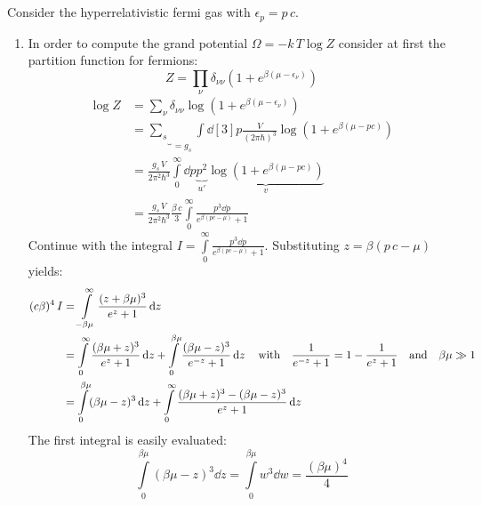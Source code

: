 \documentclass[11pt,a4paper]{scrartcl}
\newcommand{\gs}{g_{s}}
\begin{document}
\section{}

Consider the hyperrelativistic fermi gas with $\epsilon_{p}=p\,c$.

\begin{enumerate}[label=\textbf{\large(\alph*)}, itemsep=2\baselineskip]

\item
    In order to compute the grand potential $\Omega=-k\,T\log{Z}$ consider at
    first the partition function for fermions:
    \begin{equation*}
        Z=\prod_{\nu}\delta_{\nu\nu}\left(1+e^{\beta(\mu-\epsilon_{\nu})}\right)
    \end{equation*}
    \begin{align*}
        \log{Z}&=\sum_{\nu}\delta_{\nu\nu}\log(1+e^{\beta(\mu-\epsilon_{\nu})})
        \\
        &=\underbrace{\sum_{s}}_{=\gs}\int\dd[3]{p}\frac{V}{(2\pi\hbar)^3}
        \log(1+e^{\beta(\mu-pc)}) \\
        &=\frac{\gs\,V}{2\pi^2\hbar^3}\int\limits_{0}^{\infty}\dd{p}
        \underbrace{p^2}_{u'}
        \underbrace{\log(1+e^{\beta(\mu-pc)})}_{v} \\
        &=\frac{\gs\,V}{2\pi^2\hbar^3}\frac{\beta\,c}{3}\int\limits_{0}^{\infty}\frac{p^3\dd{p}}{e^{\beta(pc-\mu)}+1}
    \end{align*}
    Continue with the integral
    $\displaystyle
        I=\int\limits_{0}^{\infty}\frac{p^3\dd{p}}{e^{\beta(pc-\mu)}+1}
    $.
    Substituting $z=\beta(p\,c-\mu)$ yields:
    \begin{align*}
        (c\beta)^4\,I&=\int\limits_{-\beta\mu}^{\infty}\frac{(z+\beta\mu)^3}{e^z+1}\dd{z}
        \\
        &=\int\limits_{0}^{\infty}\frac{(\beta\mu+z)^3}{e^z+1}\dd{z}+\int\limits_{0}^{\beta\mu}\frac{(\beta\mu-z)^3}{e^{-z}+1}\dd{z}
        \qq{with}\frac{1}{e^{-z}+1}=1-\frac{1}{e^z+1}\qq{and}\beta\mu\gg{1} \\
        &=\int\limits_{0}^{\beta\mu}(\beta\mu-z)^3\dd{z}+\int\limits_{0}^{\infty}\frac{(\beta\mu+z)^3-(\beta\mu-z)^3}{e^z+1}\dd{z}
    \end{align*}
    The first integral is easily evaluated:
    \begin{equation*}
        \int\limits_{0}^{\beta\mu}(\beta\mu-z)^3\dd{z}=\int\limits_{0}^{\beta\mu}w^3\dd{w}=\frac{(\beta\mu)^4}{4}
    \end{equation*}

\end{enumerate}
\end{document}
